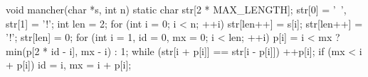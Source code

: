 void mancher(char *s, int n) {
  static char str[2 * MAX_LENGTH];
  str[0] = '~', str[1] = '!';
  int len = 2;
  for (int i = 0; i < n; ++i) {
    str[len++] = s[i];
    str[len++] = '!';
  }
  str[len] = 0;
  for (int i = 1, id = 0, mx = 0; i < len; ++i) {
    p[i] = i < mx ? min(p[2 * id - i], mx - i) : 1;
    while (str[i + p[i]] == str[i - p[i]]) ++p[i];
    if (mx < i + p[i]) id = i, mx = i + p[i];
  }
}
